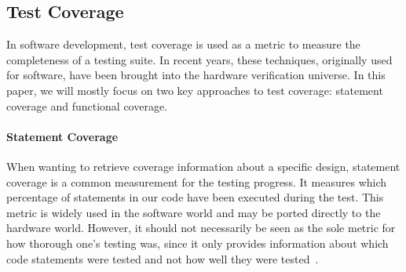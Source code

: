\documentclass[conference]{IEEEtran}
\begin{document}
\subsection{Test Coverage}
In software development, test coverage is used as a metric to measure the completeness of a testing suite. 
In recent years, these techniques, originally used for software, have been brought into the hardware verification universe. 
In this paper, we will mostly focus on two key approaches to test coverage: statement coverage and functional coverage. 

\paragraph{Statement Coverage} When wanting to retrieve coverage information about a specific design, statement coverage is a common measurement for the testing progress. It measures which percentage of statements in our code have been executed during the test. This metric is widely used in the software world and may be ported directly to the hardware world. However, it should not necessarily be seen as the sole metric for how thorough one's testing was, since it only provides information about which code statements were tested and not how well they were tested~\cite{hdlverify}. %


\end{document}
